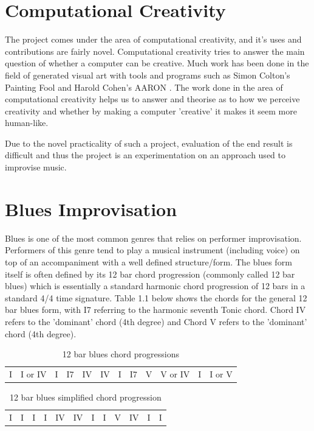 \documentclass[pdftex,12pt,a4paper]{report}
\begin{document}
\section{Computational Creativity}
The project comes under the area of computational creativity, and it's uses and contributions are fairly novel. Computational creativity tries to answer the main question of whether a computer can be creative. Much work has been done in the field of generated visual art with tools and programs such as Simon Colton's Painting Fool \cite{website:paintingfool} and Harold Cohen's AARON \cite{website:aaron}. The work done in the area of computational creativity helps us to answer and theorise as to how we perceive creativity and whether by making a computer 'creative' it makes it seem more human-like. 

Due to the novel practicality of such a project, evaluation of the end result is difficult and thus the project is an experimentation on an approach used to improvise music.

\section{Blues Improvisation}
Blues is one of the most common genres that relies on performer improvisation. Performers of this genre tend to play a musical instrument (including voice) on top of an accompaniment with a well defined structure/form. The blues form itself is often defined by its 12 bar chord progression (commonly called 12 bar blues) which is essentially a standard harmonic chord progression of 12 bars in a standard 4/4 time signature. Table 1.1 below shows the chords for the general 12 bar blues form, with I7 referring to the harmonic seventh Tonic chord. Chord IV refers to the 'dominant' chord (4th degree) and Chord V refers to the 'dominant' chord (4th degree).


\begin{table}[here]
\centering
{}
\begin{tabular}{|*{12}{C|}}
  I & I or IV & I & I7 & IV & IV & I & I7 & V & V or IV & I & I or V
\end{tabular}
\caption{12 bar blues chord progressions}
\label{12 bar blues}
\end{table}


\begin{table}[here]
\centering
{}
\begin{tabular}{|*{12}{C|}}
  I & I & I & I & IV & IV & I & I & V & IV & I & I
\end{tabular}
\caption{12 bar blues simplified chord progression}
\label{12 bar blues}
\end{table}
\end{document}
